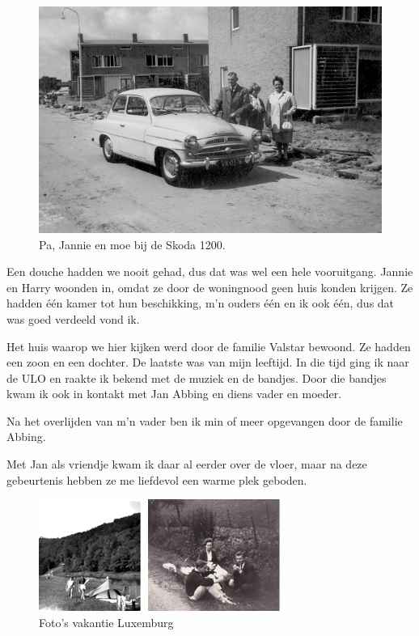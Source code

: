 \documentclass[12pt,twoside]{memoir}
\begin{document}
\begin{figure}
\includegraphics[width=\textwidth]{img/ch21/skoda}
\caption*{\footnotesize Pa, Jannie en moe bij de Skoda 1200.}
\end{figure}

Een douche hadden we nooit gehad, dus dat was wel een hele vooruitgang. Jannie en Harry woonden in, omdat ze door de woningnood geen huis konden krijgen. Ze hadden één kamer tot hun beschikking, m’n ouders één en ik ook één, dus dat was goed verdeeld vond ik. 

Het huis waarop we hier kijken werd door de familie Valstar bewoond. Ze hadden een zoon en een dochter. De laatste was van mijn leeftijd. In die tijd ging ik naar de ULO en raakte ik bekend met de muziek en de bandjes. Door die bandjes kwam ik ook in kontakt met Jan Abbing en diens vader en moeder. 

Na het overlijden van m’n vader ben ik min of meer opgevangen door de familie Abbing. 

Met Jan als vriendje kwam ik daar al eerder over de vloer, maar na deze gebeurtenis hebben ze me liefdevol een warme plek geboden.

\begin{figure}
\includegraphics[width=\textwidth]{img/ch21/luxvak}
\caption*{\footnotesize Foto’s vakantie Luxemburg}
\end{figure}
\end{document}
